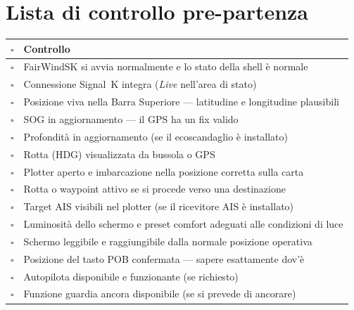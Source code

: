 \section{Lista di controllo pre-partenza}

\begin{longtable}{C{0.8cm}L{12.9cm}}
\toprule
{}
\color{white}\sffamily\bfseries $\square$ &
\color{white}\sffamily\bfseries Controllo \\
\midrule
$\square$ & FairWindSK si avvia normalmente e lo stato della shell è normale \\
$\square$ & Connessione Signal~K integra (\textit{Live} nell'area di stato) \\
$\square$ & Posizione viva nella Barra Superiore --- latitudine e longitudine plausibili \\
$\square$ & SOG in aggiornamento --- il GPS ha un fix valido \\
$\square$ & Profondità in aggiornamento (se il ecoscandaglio è installato) \\
$\square$ & Rotta (HDG) visualizzata da bussola o GPS \\
$\square$ & Plotter aperto e imbarcazione nella posizione corretta sulla carta \\
$\square$ & Rotta o waypoint attivo se si procede verso una destinazione \\
$\square$ & Target AIS visibili nel plotter (se il ricevitore AIS è installato) \\
$\square$ & Luminosità dello schermo e preset comfort adeguati alle condizioni di luce \\
$\square$ & Schermo leggibile e raggiungibile dalla normale posizione operativa \\
$\square$ & Posizione del tasto POB confermata --- sapere esattamente dov'è \\
$\square$ & Autopilota disponibile e funzionante (se richiesto) \\
$\square$ & Funzione guardia ancora disponibile (se si prevede di ancorare) \\
\bottomrule
\end{longtable}
